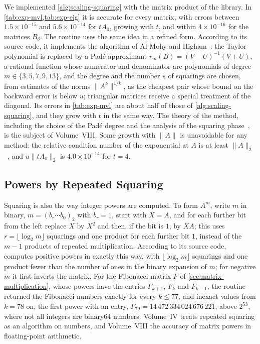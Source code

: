 We implemented \cref{alg:scaling-squaring} with the matrix product of the library. In \cref{tab:exp-mvl,tab:exp-eig} it is accurate for every matrix, with errors between $1.5\times10^{-15}$ and $5.6\times10^{-14}$ for $tA_0$, growing with $t$, and within $4\times10^{-16}$ for the matrices $B_\delta$. The routine  uses the same idea in a refined form. According to its source code, it implements the algorithm of Al-Mohy and Higham~\cite{almohy2009}: the Taylor polynomial is replaced by a Pad\'e approximant $r_m(B)=(V-U)^{-1}(V+U)$, a rational function whose numerator and denominator are polynomials of degree $m\in\{3,5,7,9,13\}$, and the degree and the number $s$ of squarings are chosen, from estimates of the norms $\|A^k\|^{1/k}$, as the cheapest pair whose bound on the backward error is below $u$; triangular matrices receive a special treatment of the diagonal. Its errors in \cref{tab:exp-mvl} are about half of those of \cref{alg:scaling-squaring}, and they grow with $t$ in the same way. The theory of the method, including the choice of the Pad\'e degree and the analysis of the squaring phase~\cite{higham2005}, is the subject of Volume~VIII. Some growth with $\|A\|$ is unavoidable for any method: the relative condition number of the exponential at $A$ is at least $\|A\|_2$~\cite[Sect.~10.2]{higham2008}, and $u\|tA_0\|_2$ is $4.0\times10^{-14}$ for $t=4$.

\subsection{Powers by Repeated Squaring}

Squaring is also the way integer powers are computed. To form $A^m$, write $m$ in binary, $m=(b_r\cdots b_0)_2$ with $b_r=1$, start with $X=A$, and for each further bit from the left replace $X$ by $X^2$ and then, if the bit is $1$, by $XA$; this uses $r=\lfloor\log_2m\rfloor$ squarings and one product for each further bit $1$, instead of the $m-1$ products of repeated multiplication. According to its source code,  computes positive powers in exactly this way, with $\lfloor\log_2m\rfloor$ squarings and one product fewer than the number of ones in the binary expansion of $m$; for negative $m$ it first inverts the matrix. For the Fibonacci matrix $F$ of \cref{sec:matrix-multiplication}, whose powers have the entries $F_{k+1}$, $F_k$ and $F_{k-1}$, the routine returned the Fibonacci numbers exactly for every $k\le77$, and inexact values from $k=78$ on, the first power with an entry, $F_{79}=14\,472\,334\,024\,676\,221$, above $2^{53}$, where not all integers are binary64 numbers. Volume~IV treats repeated squaring as an algorithm on numbers, and Volume~VIII the accuracy of matrix powers in floating-point arithmetic.

